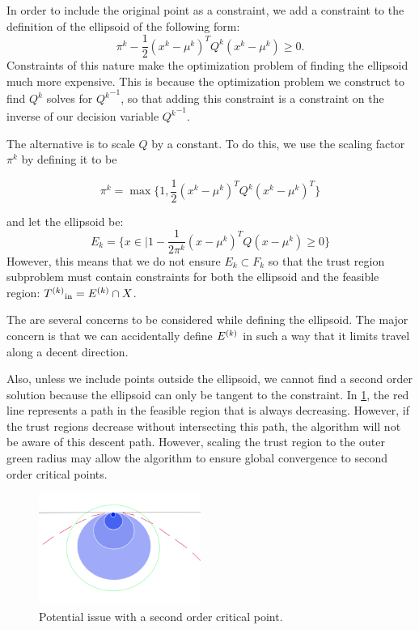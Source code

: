 
In order to include the original point as a constraint, we add a constraint to the definition of the ellipsoid of the following form:
$$ \pi^k - \frac 1 2 (x^k - \mu^{k})^TQ^{k}(x^k - \mu^{k}) \ge 0. $$
Constraints of this nature make the optimization problem of finding the ellipsoid much more expensive.
This is because the optimization problem we construct to find $Q^k$ solves for ${Q^k}^{-1}$, so that adding this constraint is a constraint on the inverse of our decision variable ${Q^{k}}^{-1}$.


The alternative is to scale $Q$ by a constant.
To do this, we use the scaling factor $\pi^k$ by defining it to be

$$\pi^k = \max \{1, \frac 1 {2} (x^{k} - \mu^{k})^T Q^k (x^{k} - \mu^{k})^T \}$$

and let the ellipsoid be:
$$E_k = \{x \in \mathbb | 1 - \frac 1 {2\pi^k} (x - \mu^{k})^T Q (x - \mu^{k}) \ge 0\} $$
However, this means that we do not ensure $E_k \subset F_k$ so that the trust region subproblem must contain constraints for both the ellipsoid and the feasible region: ${T^{(k)}}_{\text{in}} = {E^{(k)}} \cap X$.

The are several concerns to be considered while defining the ellipsoid.
The major concern is that we can accidentally define ${E^{(k)}}$ in such a way that it limits travel along a decent direction.


Also, unless we include points outside the ellipsoid, we cannot find a second order solution because the ellipsoid can only be tangent to the constraint.
In \cref{fbns}, the red line represents a path in the feasible region that is always decreasing.
However, if the trust regions decrease without intersecting this path, the algorithm will not be aware of this descent path.
However, scaling the trust region to the outer green radius may allow the algorithm to ensure global convergence to second order critical points.

\begin{figure}[h]
    \centering
    \includegraphics[width=200px]{images/second_order_critical_point.png}
    \caption{Potential issue with a second order critical point.}
    \label{fbns}
\end{figure}



